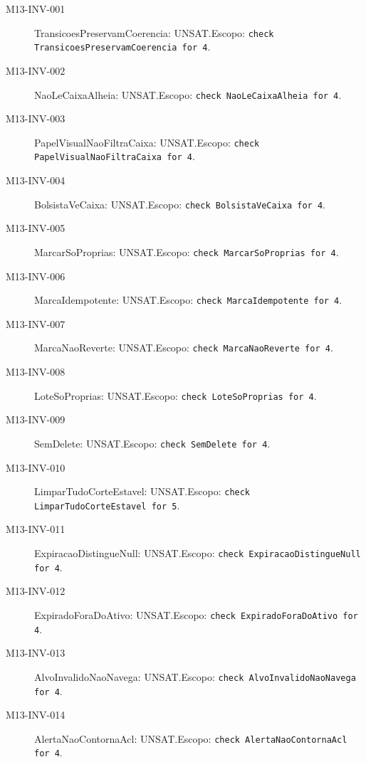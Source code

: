 \begin{description}
\item[M13-INV-001] TransicoesPreservamCoerencia: UNSAT.\newline Escopo: \texttt{check TransicoesPreservamCoerencia for 4}.
\item[M13-INV-002] NaoLeCaixaAlheia: UNSAT.\newline Escopo: \texttt{check NaoLeCaixaAlheia for 4}.
\item[M13-INV-003] PapelVisualNaoFiltraCaixa: UNSAT.\newline Escopo: \texttt{check PapelVisualNaoFiltraCaixa for 4}.
\item[M13-INV-004] BolsistaVeCaixa: UNSAT.\newline Escopo: \texttt{check BolsistaVeCaixa for 4}.
\item[M13-INV-005] MarcarSoProprias: UNSAT.\newline Escopo: \texttt{check MarcarSoProprias for 4}.
\item[M13-INV-006] MarcaIdempotente: UNSAT.\newline Escopo: \texttt{check MarcaIdempotente for 4}.
\item[M13-INV-007] MarcaNaoReverte: UNSAT.\newline Escopo: \texttt{check MarcaNaoReverte for 4}.
\item[M13-INV-008] LoteSoProprias: UNSAT.\newline Escopo: \texttt{check LoteSoProprias for 4}.
\item[M13-INV-009] SemDelete: UNSAT.\newline Escopo: \texttt{check SemDelete for 4}.
\item[M13-INV-010] LimparTudoCorteEstavel: UNSAT.\newline Escopo: \texttt{check LimparTudoCorteEstavel for 5}.
\item[M13-INV-011] ExpiracaoDistingueNull: UNSAT.\newline Escopo: \texttt{check ExpiracaoDistingueNull for 4}.
\item[M13-INV-012] ExpiradoForaDoAtivo: UNSAT.\newline Escopo: \texttt{check ExpiradoForaDoAtivo for 4}.
\item[M13-INV-013] AlvoInvalidoNaoNavega: UNSAT.\newline Escopo: \texttt{check AlvoInvalidoNaoNavega for 4}.
\item[M13-INV-014] AlertaNaoContornaAcl: UNSAT.\newline Escopo: \texttt{check AlertaNaoContornaAcl for 4}.

\end{description}
